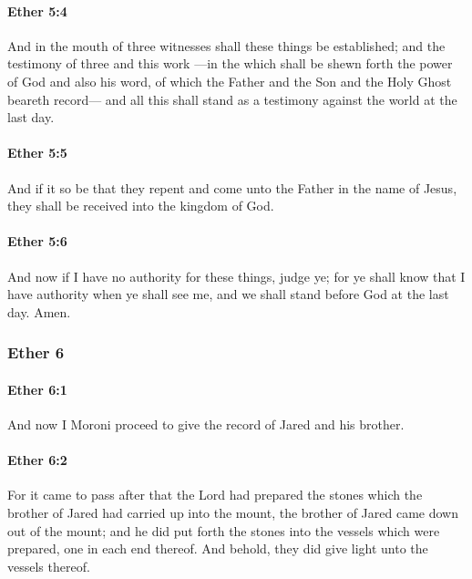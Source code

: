 		\paragraph{Ether 5:4} %
			\label{ETHER-5-4}

			And in the mouth of three witnesses shall these things be established;
			and the testimony of three and this work
			---in the which shall be shewn forth the power of God and also his word,
			of which the Father and the Son and the Holy Ghost beareth record---
			and all this shall stand as a testimony against the world at the last day.

		\paragraph{Ether 5:5} %
			\label{ETHER-5-5}

			And if it so be that they repent and come unto the Father in the name of Jesus,
			they shall be received into the kingdom of God.

		\paragraph{Ether 5:6} %
			\label{ETHER-5-6}

			And now if I have no authority for these things, judge ye;
			for ye shall know that I have authority when ye shall see me,
			and we shall stand before God at the last day.
			Amen.

	\subsubsection{Ether 6} %
		\label{ETHER-6}
		
		\paragraph{Ether 6:1} %
			\label{ETHER-6-1}

			And now I Moroni proceed to give the record of Jared and his brother.

		\paragraph{Ether 6:2} %
			\label{ETHER-6-2}

			For it came to pass after that the Lord had prepared the stones
			which the brother of Jared had carried up into the mount,
			the brother of Jared came down out of the mount;
			and he did put forth the stones into the vessels which were prepared,
			one in each end thereof.
			And behold, they did give light unto the vessels thereof.

